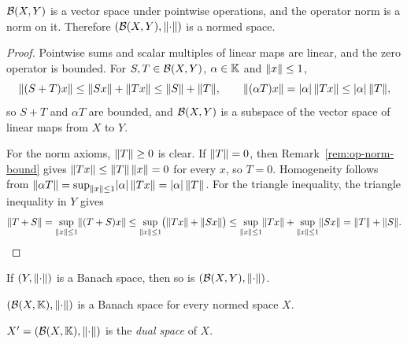\begin{theorem}\label{thm:BXY-normed}
$\mathcal{B}(X, Y)$ is a vector space under pointwise operations, and the operator
norm is a norm on it. Therefore $(\mathcal{B}(X, Y), \lVert\cdot\rVert)$ is a normed
space.
\end{theorem}

\begin{proof}
Pointwise sums and scalar multiples of linear maps are linear, and the zero
operator is bounded. For $S, T \in \mathcal{B}(X, Y)$, $\alpha \in \mathbb{K}$ and
$\lVert x\rVert \le 1$,
\[
  \lVert(S + T)x\rVert \le \lVert Sx\rVert + \lVert Tx\rVert \le \lVert S\rVert + \lVert T\rVert,
  \qquad
  \lVert(\alpha T)x\rVert = \lvert\alpha\rvert\,\lVert Tx\rVert \le \lvert\alpha\rvert\,\lVert T\rVert,
\]
so $S + T$ and $\alpha T$ are bounded, and $\mathcal{B}(X, Y)$ is a subspace of
the vector space of linear maps from $X$ to $Y$.

For the norm axioms, $\lVert T\rVert \ge 0$ is clear. If $\lVert T\rVert = 0$, then
Remark~\ref{rem:op-norm-bound} gives $\lVert Tx\rVert \le \lVert T\rVert\,\lVert x\rVert = 0$
for every $x$, so $T = 0$. Homogeneity follows from
$\lVert\alpha T\rVert = \sup_{\lVert x\rVert \le 1} \lvert\alpha\rvert\,\lVert Tx\rVert
= \lvert\alpha\rvert\,\lVert T\rVert$. For the triangle inequality, the triangle
inequality in $Y$ gives
\[
  \lVert T + S\rVert = \sup_{\lVert x\rVert \le 1} \lVert(T + S)x\rVert
  \le \sup_{\lVert x\rVert \le 1} \bigl(\lVert Tx\rVert + \lVert Sx\rVert\bigr)
  \le \sup_{\lVert x\rVert \le 1} \lVert Tx\rVert + \sup_{\lVert x\rVert \le 1} \lVert Sx\rVert
  = \lVert T\rVert + \lVert S\rVert . \qedhere
\]
\end{proof}

\begin{theorem}\label{thm:BXY-banach}
If $(Y, \lVert\cdot\rVert)$ is a Banach space, then so is
$(\mathcal{B}(X, Y), \lVert\cdot\rVert)$.
\end{theorem}

\begin{corollary}\label{cor:dual-banach}
$(\mathcal{B}(X, \mathbb{K}), \lVert\cdot\rVert)$ is a Banach space for every normed space $X$.
\end{corollary}

\begin{notation}
$X' = (\mathcal{B}(X, \mathbb{K}), \lVert\cdot\rVert)$ is the \emph{dual space} of $X$.
\end{notation}

